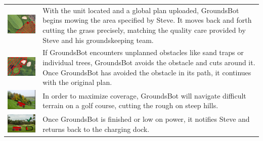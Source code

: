 \documentclass[12pt]{extarticle}
\begin{document}
\begin{table}[H]
   \def\arraystretch{4}
   \setlength\tabcolsep{8pt}


\begin{tabularx}{\textwidth}{cX}
\includegraphics[width=6cm, valign=t]{usecase1_5.png} &
With the unit located and a global plan uploaded, GroundsBot begins mowing the area specified by Steve. It moves back and forth cutting the grass precisely, matching the quality care provided by Steve and his groundskeeping team.
\\
\includegraphics[width=6cm, valign=t]{usecase1_6.png} &
If GroundsBot encounters unplanned obstacles like sand traps or individual trees, GroundsBot avoids the obstacle and cuts around it. Once GroundsBot has avoided the obstacle in its path, it continues with the original plan.
\\
\includegraphics[width=6cm, valign=t]{usecase1_7.png} &
In order to maximize coverage, GroundsBot will navigate difficult terrain on a golf course, cutting the rough on steep hills.
\\
\includegraphics[width=6cm, valign=t]{usecase2_1.png} &
Once GroundsBot is finished or low on power, it notifies Steve and returns back to the charging dock.
\\

\end{tabularx}
\end{table}
\end{document}
